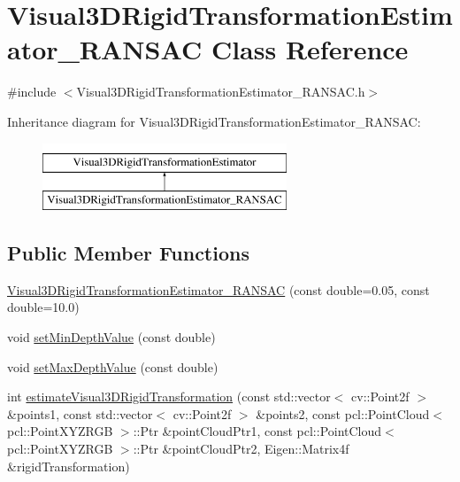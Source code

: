 \hypertarget{class_visual3_d_rigid_transformation_estimator___r_a_n_s_a_c}{
\section{Visual3DRigidTransformationEstimator\_\-RANSAC Class Reference}
\label{class_visual3_d_rigid_transformation_estimator___r_a_n_s_a_c}
}


{\ttfamily \#include $<$Visual3DRigidTransformationEstimator\_\-RANSAC.h$>$}

Inheritance diagram for Visual3DRigidTransformationEstimator\_\-RANSAC:\begin{figure}[H]
\begin{center}
\leavevmode
\includegraphics[height=2.000000cm]{class_visual3_d_rigid_transformation_estimator___r_a_n_s_a_c}
\end{center}
\end{figure}
\subsection*{Public Member Functions}
\begin{DoxyCompactItemize}
\item 
\hyperlink{class_visual3_d_rigid_transformation_estimator___r_a_n_s_a_c_a73fc605acb5765ffe6bef88b3c025625}{Visual3DRigidTransformationEstimator\_\-RANSAC} (const double=0.05, const double=10.0)
\item 
void \hyperlink{class_visual3_d_rigid_transformation_estimator___r_a_n_s_a_c_adc981ee0d2fc15c0c5273cfbc7a353b0}{setMinDepthValue} (const double)
\item 
void \hyperlink{class_visual3_d_rigid_transformation_estimator___r_a_n_s_a_c_af74500de40c35f98785de01a3baf5143}{setMaxDepthValue} (const double)
\item 
int \hyperlink{class_visual3_d_rigid_transformation_estimator___r_a_n_s_a_c_a1e97ade711022e984566bbed9561a46a}{estimateVisual3DRigidTransformation} (const std::vector$<$ cv::Point2f $>$ \&points1, const std::vector$<$ cv::Point2f $>$ \&points2, const pcl::PointCloud$<$ pcl::PointXYZRGB $>$::Ptr \&pointCloudPtr1, const pcl::PointCloud$<$ pcl::PointXYZRGB $>$::Ptr \&pointCloudPtr2, Eigen::Matrix4f \&rigidTransformation)
\end{DoxyCompactItemize}

